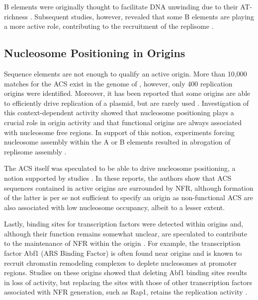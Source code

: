 B elements were originally thought to facilitate DNA unwinding due to their AT-richness \cite{huang:1993:dna}. Subsequent studies, however, revealed that some B elements are playing a more active role, contributing to the recruitment of the replisome \cite{wilmes:2002:b2}.

\subsection{Nucleosome Positioning in Origins}

Sequence elements are not enough to qualify an active origin. 
More than 10,000 matches for the ACS exist in the genome of \cer{}, however, only 400 replication origins were identified. 
Moreover, it has been reported that some origins are able to efficiently drive replication of a plasmid, but are rarely used \invivo{} \cite{newlon:1993:analysis, santocanale:1999:activation}. 
Investigation of this context-dependent activity showed that nucleosome positioning plays a crucial role in origin activity and that functional origins \invivo{} are always associated with nucleosome free regions. 
In support of this notion, experiments forcing nucleosome assembly within the A or B elements resulted in abrogation of replisome assembly \cite{lipford:2001:nucleosomes}. 


The ACS itself was speculated to be able to drive nucleosome positioning, a notion supported by \invivo{} studies \cite{eaton:2010:conserved, berbenetz:2010:diversity}.
In these reports, the authors show that ACS sequences contained in active origins are surrounded by NFR, although formation of the latter is per se not sufficient to specify an origin as non-functional ACS are also associated with low nucleosome occupancy, albeit to a lesser extent.


Lastly, binding sites for transcription factors were detected within origins and, although their function remains somewhat unclear, are speculated to contribute to the maintenance of NFR within the origin \cite{diffley:1992:proteindna, rhode:1989:gene}. 
For example, the transcription factor Abf1 (ARS Binding Factor) is often found near origins and is known to recruit chromatin remodeling complexes to deplete nucleosomes at promoter regions. 
Studies on these origins showed that deleting Abf1 binding sites results in loss of activity, but replacing the sites with those of other transcription factors associated with NFR generation, such as Rap1, retains the replication activity \cite{marahrens:1992:yeast}.

